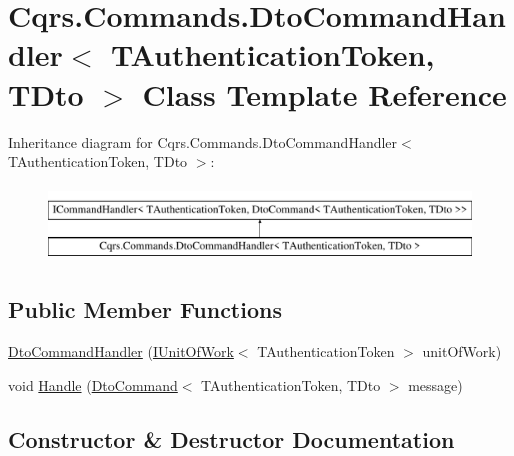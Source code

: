 \hypertarget{classCqrs_1_1Commands_1_1DtoCommandHandler}{}\section{Cqrs.\+Commands.\+Dto\+Command\+Handler$<$ T\+Authentication\+Token, T\+Dto $>$ Class Template Reference}
\label{classCqrs_1_1Commands_1_1DtoCommandHandler}
Inheritance diagram for Cqrs.\+Commands.\+Dto\+Command\+Handler$<$ T\+Authentication\+Token, T\+Dto $>$\+:\begin{figure}[H]
\begin{center}
\leavevmode
\includegraphics[height=2.000000cm]{classCqrs_1_1Commands_1_1DtoCommandHandler}
\end{center}
\end{figure}
\subsection*{Public Member Functions}
\begin{DoxyCompactItemize}
\item 
\hyperlink{classCqrs_1_1Commands_1_1DtoCommandHandler_aaff94627552cf26c503c628eb49adb60_aaff94627552cf26c503c628eb49adb60}{Dto\+Command\+Handler} (\hyperlink{interfaceCqrs_1_1Domain_1_1IUnitOfWork}{I\+Unit\+Of\+Work}$<$ T\+Authentication\+Token $>$ unit\+Of\+Work)
\item 
void \hyperlink{classCqrs_1_1Commands_1_1DtoCommandHandler_a344c5d909b31fe7ad6b81c69ab569fc8_a344c5d909b31fe7ad6b81c69ab569fc8}{Handle} (\hyperlink{classCqrs_1_1Commands_1_1DtoCommand}{Dto\+Command}$<$ T\+Authentication\+Token, T\+Dto $>$ message)
\end{DoxyCompactItemize}


\subsection{Constructor \& Destructor Documentation}
\mbox{\label{classCqrs_1_1Commands_1_1DtoCommandHandler_aaff94627552cf26c503c628eb49adb60_aaff94627552cf26c503c628eb49adb60}} 
